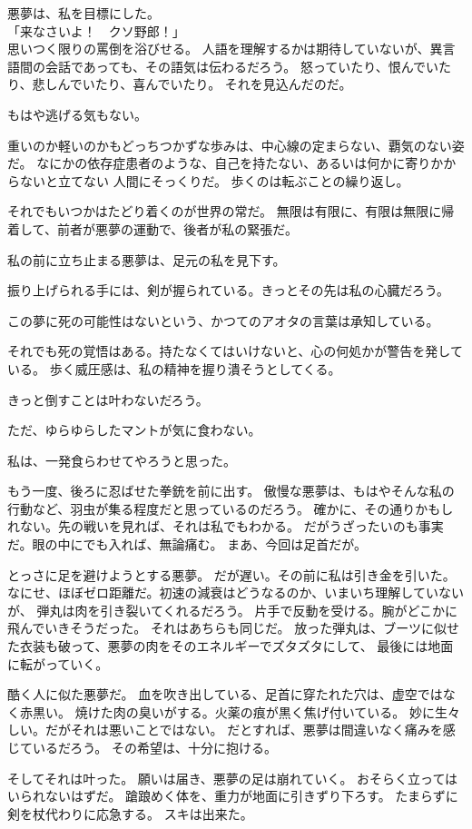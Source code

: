 \documentclass[../IHMain]{subfiles}
\begin{document}
悪夢は、私を目標にした。\\
「来なさいよ！　クソ野郎！」\\
思いつく限りの罵倒を浴びせる。
人語を理解するかは期待していないが、異言語間の会話であっても、その語気は伝わるだろう。
怒っていたり、恨んでいたり、悲しんでいたり、喜んでいたり。
それを見込んだのだ。

もはや逃げる気もない。

重いのか軽いのかもどっちつかずな歩みは、中心線の定まらない、覇気のない姿だ。
なにかの依存症患者のような、自己を持たない、あるいは何かに寄りかからないと立てない
人間にそっくりだ。
歩くのは転ぶことの繰り返し。

それでもいつかはたどり着くのが世界の常だ。
無限は有限に、有限は無限に帰着して、前者が悪夢の運動で、後者が私の緊張だ。

私の前に立ち止まる悪夢は、足元の私を見下す。

振り上げられる手には、剣が握られている。きっとその先は私の心臓だろう。

この夢に死の可能性はないという、かつてのアオタの言葉は承知している。

それでも死の覚悟はある。持たなくてはいけないと、心の何処かが警告を発している。
歩く威圧感は、私の精神を握り潰そうとしてくる。

きっと倒すことは叶わないだろう。

ただ、ゆらゆらしたマントが気に食わない。

私は、一発食らわせてやろうと思った。

もう一度、後ろに忍ばせた拳銃を前に出す。
傲慢な悪夢は、もはやそんな私の行動など、羽虫が集る程度だと思っているのだろう。
確かに、その通りかもしれない。先の戦いを見れば、それは私でもわかる。
だがうざったいのも事実だ。眼の中にでも入れば、無論痛む。
まあ、今回は足首だが。

とっさに足を避けようとする悪夢。
だが遅い。その前に私は引き金を引いた。
なにせ、ほぼゼロ距離だ。初速の減衰はどうなるのか、いまいち理解していないが、
弾丸は肉を引き裂いてくれるだろう。
片手で反動を受ける。腕がどこかに飛んでいきそうだった。
それはあちらも同じだ。
放った弾丸は、ブーツに似せた衣装も破って、悪夢の肉をそのエネルギーでズタズタにして、
最後には地面に転がっていく。

酷く人に似た悪夢だ。
血を吹き出している、足首に穿たれた穴は、虚空ではなく赤黒い。
焼けた肉の臭いがする。火薬の痕が黒く焦げ付いている。
妙に生々しい。だがそれは悪いことではない。
だとすれば、悪夢は間違いなく痛みを感じているだろう。
その希望は、十分に抱ける。

そしてそれは叶った。
願いは届き、悪夢の足は崩れていく。
おそらく立ってはいられないはずだ。
蹌踉めく体を、重力が地面に引きずり下ろす。
たまらずに剣を杖代わりに応急する。
スキは出来た。
\end{document}
